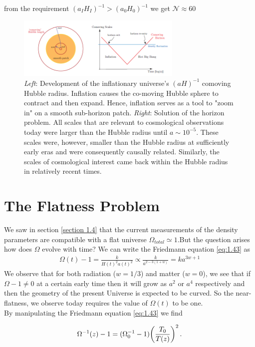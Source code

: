 from the requirement  $(a_I H_I)^{-1} > (a_0 H_0)^{-1}$ we get $\mathcal{N} \approx 60 $
\begin{figure}[h]
    \centering
    \includegraphics[width=0.7\textwidth]{horizon.png}
    \caption{\emph{Left}: Development of the inflationary universe's $(aH)^{-1}$ comoving Hubble radius. Inflation causes the co-moving Hubble sphere to contract and then expand. Hence, inflation serves as a tool to "zoom in" on a smooth sub-horizon patch. \emph{Right}: Solution of the horizon problem. All scales that are relevant to cosmological observations today were larger than the Hubble radius until $a \sim 10^{-5}$. These scales were, however, smaller than the Hubble radius at sufficiently early eras and were consequently causally related. Similarly, the scales of cosmological interest came back within the Hubble radius in relatively recent times.\cite{baumann2012tasi}}
    \label{fig:2.1} 
\end{figure}

\section{The Flatness Problem}
We saw in  section \ref{section 1.4} that the current measurements of the density parameters are compatible with a flat universe $\Omega_{total} \simeq 1 $.But the question arises how does $\Omega $ evolve with time?
We can write the Friedmann equation \ref{eq:1.43} as 
\begin{align}
    \Omega(t)-1 = \frac{k}{H(t)^{2} a(t)^{2}} \propto  \frac{k}{a^{2-3(1+w)}} = ka^{3w+1} \label{2.2}
\end{align}
We observe that for both radiation ($w = 1/3$) and matter ($w = 0$), we see that if $\Omega - 1 \neq 0$ at a certain early time then it will grow as $a^2$ or 
$a^4$ respectively and then the geometry of the present Universe is expected to be curved. So the near-flatness, we observe today requires the value of $\Omega(t)$ to be one. \\
By manipulating the Friedmann equation \ref{eq:1.43} we find

\begin{align}
  \Omega ^{-1} (z) -1
  = (\Omega_0 ^{-1} -1)\qty(\frac{T_0 }{T(z)})^{2} \,.
\end{align}

